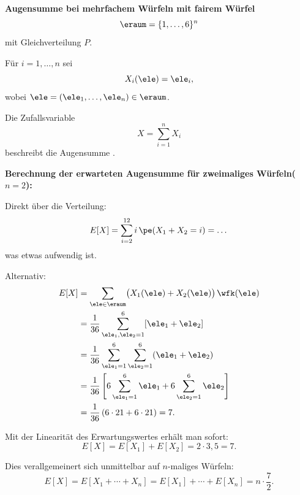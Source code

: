 \begin{bsp}
    \textbf{Augensumme bei mehrfachem Würfeln mit fairem Würfel} 
\[
        \eraum = \{1,\dots,6\}^n
    \]
    mit Gleichverteilung \(P\).

    Für \(i=1,\dots,n\) sei
    \[
        X_i(\ele)=\ele_i,
    \]
    wobei \(\ele=(\ele_1,\dots,\ele_n)\in\eraum\).

    Die Zufallsvariable
    \[
        X=\sum_{i=1}^{n} X_i
    \]
    beschreibt die Augensumme .

    \textbf{Berechnung der erwarteten Augensumme für zweimaliges Würfeln(\(n=2\)):}

    Direkt über die Verteilung:
    \[
        E[X]
        =
        \sum_{i=2}^{12}
        i \, \pe(X_1+X_2=i) = \dots
    \]
    was etwas aufwendig ist.

    Alternativ:
    \[
        \begin{aligned}
            E[X]
            &=
            \sum_{\ele\in\eraum}
            \bigl(X_1(\ele)+X_2(\ele)\bigr)\,\wfk(\ele) \\
            &=
            \frac{1}{36}
            \sum_{\ele_1, \ele_2=1}^{6} [\ele_1 + \ele_2] \\
            &=
            \frac{1}{36}
            \sum_{\ele_1=1}^{6}
            \sum_{\ele_2=1}^{6}
            (\ele_1+\ele_2) \\
            &=
            \frac{1}{36}
            \left[
                6\sum_{\ele_1=1}^{6}\ele_1
            +
            6\sum_{\ele_2=1}^{6}\ele_2
            \right] \\
            &=
            \frac{1}{36}
            \left(
                6\cdot 21 + 6\cdot 21
            \right)
            =
            7.
        \end{aligned}
    \]

    Mit der Linearität des Erwartungswertes erhält man sofort:
    \[
        E[X]
        =
        E[X_1]+E[X_2]
        =
        2\cdot 3,5
        =
        7.
    \]

    Dies verallgemeinert sich unmittelbar auf \(n\)-maliges Würfeln:
    \[
        E[X]
        =
        E[X_1+\cdots+X_n]
        =
        E[X_1]+\cdots+E[X_n]
        =
        n\cdot\frac{7}{2}.
    \]
\end{bsp}

